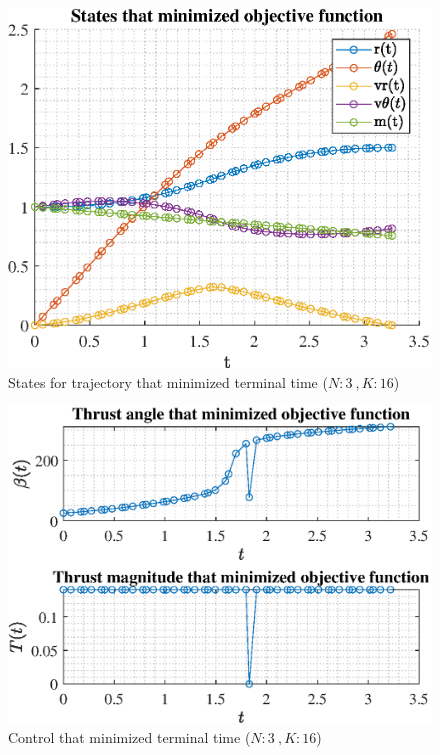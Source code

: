 \documentclass[]{article}
\begin{document}
\begin{figure}
	\centering
	\includegraphics[scale=0.75]{states_N3_K16_C3_tf.eps}
	\caption{States for trajectory that minimized terminal time (\(N:3\ , K:16\))}
	\label{fig:states_N3_K16_C3_tf}
\end{figure}
\begin{figure}
	\centering
	\includegraphics[scale=0.75]{control_N3_K16_C3_tf.eps}
	\caption{Control that minimized terminal time (\(N:3\ , K:16\))}
	\label{fig:control_N3_K16_C3_tf}
\end{figure}
\end{document}
